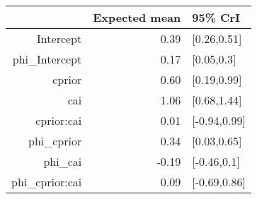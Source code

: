 \begin{tabular}{rrl}
  \hline
 & Expected mean & 95\% CrI \\ 
  \hline
Intercept & 0.39 & [0.26,0.51] \\ 
  phi\_Intercept & 0.17 & [0.05,0.3] \\ 
  cprior & 0.60 & [0.19,0.99] \\ 
  cai & 1.06 & [0.68,1.44] \\ 
  cprior:cai & 0.01 & [-0.94,0.99] \\ 
  phi\_cprior & 0.34 & [0.03,0.65] \\ 
  phi\_cai & -0.19 & [-0.46,0.1] \\ 
  phi\_cprior:cai & 0.09 & [-0.69,0.86] \\ 
   \hline
\end{tabular}

